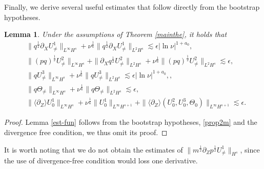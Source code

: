 \documentclass[12pt]{article}
\def\red#1{\textcolor{red}{#1}}
\newcommand{\wtb}{\langle\partial_Z\rangle }
\newtheorem{lemma}{Lemma}[section]
\numberwithin{equation}{section}
\begin{document}
Finally, we derive several useful estimates that follow directly from the bootstrap hypotheses.
    \begin{lemma}\label{est-fun}
        Under the assumptions of Theorem \ref{mainthe}, it holds that
        \begin{align*}
        &\|q^{\frac{1}{2}}\partial_X U^1_{\neq}\|_{L^\infty H^s}+\nu^{\frac{1}{6}}\|q^{\frac{1}{2}}\partial_X U^1_{\neq}\|_{L^2 H^s}\lesssim\epsilon|\ln{\nu} |^{1+a_0},\\
		&\|(pq)^{\frac{1}{2}}U^2_{\neq}\|_{L^\infty H^s}+\|\partial_Xq^{\frac{1}{2}}U^2_{\neq}\|_{L^2 H^s}+\nu^{\frac{1}{6}}\|(pq)^{\frac{1}{2}}U^2_{\neq}\|_{L^2 H^s}\lesssim\epsilon,\\
		&\|q U^3_{\neq}\|_{L^\infty H^s}+\nu^{\frac{1}{6}}\|q U^3_{\neq}\|_{L^2 H^s}\lesssim\epsilon|\ln{\nu} |^{1+a_0},,\\
		&\|q\Theta_{\neq}\|_{L^\infty H^s}+\nu^{\frac{1}{6}}\|q\Theta_{\neq}\|_{L^2H^s}\lesssim\epsilon,\\
		&\|\wtb U^1_{0}\|_{L^\infty H^s}+\nu^{\frac{1}{6}}\|U^1_{0}\| _{L^\infty H^{s+1}}+\|\wtb (U^2_{0},U_0^3,\Theta_0) \|_{L^\infty H^{s+1}} \lesssim\epsilon.
	\end{align*}
    \end{lemma}
    \begin{proof}
        Lemma \eqref{est-fun} follows from the bootstrap hypotheses, \eqref{prop2m} and the divergence free condition, we thus omit its proof. 
    \end{proof}
    It is worth noting that we do not obtain the estimates of $\|m^{\frac{1}{2}}\partial_Zp^{\frac{1}{2}}U^1_{\neq}\|_{H^s}$, since the use of divergence-free condition would loss one derivative.
	
	 
    
\end{document}
